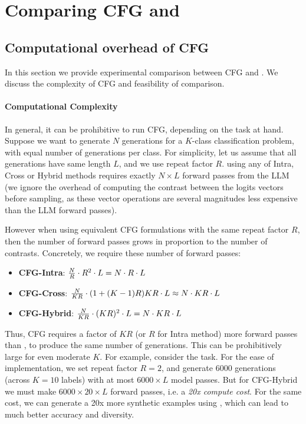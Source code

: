 \section{Comparing CFG and \corrsyn{}}
\label{sec:compare_cfg_corrsyn_app}
\subsection{Computational overhead of CFG}
\label{app:compute_complexity}

In this section we provide experimental comparison between CFG and \corrsyn{}. We discuss the complexity of CFG and feasibility of comparison. 

\paragraph{Computational Complexity} In general, it can be prohibitive to run CFG, depending on the task at hand. Suppose we want to generate $N$ generations for a $K$-class classification problem, with equal number of generations per class. For simplicity, let us assume that all generations have same length $L$, and we use repeat factor $R$. \corrsyn{} using any of Intra, Cross or Hybrid methods requires exactly $N\times L$ forward passes from the LLM (we ignore the overhead of computing the contrast between the logits vectors before sampling, as these vector operations are several magnitudes less expensive than the LLM forward passes).

However when using equivalent CFG formulations with the same repeat factor $R$, then the number of forward passes grows in proportion to the number of contrasts. Concretely, we require these number of forward passes:
\begin{itemize}
    \item \textbf{\textsc{CFG}-Intra}: $\frac{N}{R}\cdot R^2 \cdot L \\ { } = N\cdot R\cdot L $
    \item \textbf{\textsc{CFG}-Cross}: $\frac{N}{KR}\cdot (1+(K-1)R)KR\cdot L \\ { }  \approx N\cdot KR\cdot L $
    \item \textbf{\textsc{CFG}-Hybrid}: $\frac{N}{KR}\cdot (KR)^2\cdot L \\ { } = N\cdot KR\cdot L $
\end{itemize}

Thus, CFG requires a factor of $KR$ (or $R$ for Intra method) more forward passes than \corrsyn{}, to produce the same number of generations. This can be prohibitively large for even moderate $K$. For example, consider the \ToIHeadlines{} task. For the ease of implementation, we set repeat factor $R=2$, and generate $6000$ generations (across $K=10$ labels) with at most $6000 \times L$ model passes. But for CFG-Hybrid we must make $6000 \times 20 \times L$ forward passes, i.e. a \textit{20x compute cost}. For the same cost, we can generate a 20x more synthetic examples using \corrsyn, which can lead to much better accuracy and diversity. 

